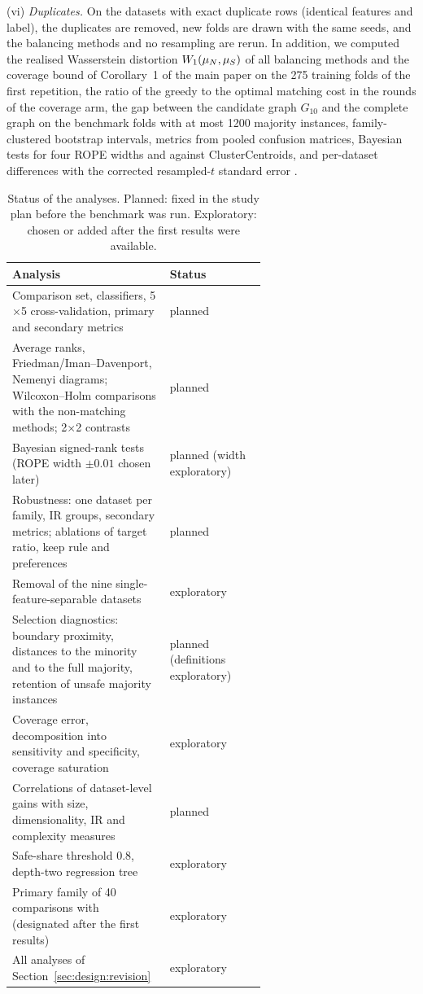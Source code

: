 (vi) \emph{Duplicates.} On the datasets with exact duplicate rows (identical features and label), the duplicates are removed, new folds are drawn with the same seeds, and the balancing methods and no resampling are rerun.
In addition, we computed the realised Wasserstein distortion $W_1(\mu_N,\mu_S)$ of all balancing methods and the coverage bound of Corollary~1 of the main paper on the 275 training folds of the first repetition, the ratio of the greedy to the optimal matching cost in the rounds of the coverage arm, the gap between the candidate graph $G_{10}$ and the complete graph on the benchmark folds with at most 1200 majority instances, family-clustered bootstrap intervals, metrics from pooled confusion matrices, Bayesian tests for four ROPE widths and against ClusterCentroids, and per-dataset differences with the corrected resampled-$t$ standard error \citep{nadeau2003inference}.

\begin{table}[t]
\centering
\caption{Status of the analyses. Planned: fixed in the study plan before the benchmark was run. Exploratory: chosen or added after the first results were available.}\label{tab:analysis_status}
\footnotesize
\begin{tabular}{@{}p{0.62\linewidth}l@{}}
\toprule
Analysis & Status \\
\midrule
Comparison set, classifiers, 5$\times$5 cross-validation, primary and secondary metrics & planned \\
Average ranks, Friedman/Iman--Davenport, Nemenyi diagrams; Wilcoxon--Holm comparisons with the non-matching methods; 2$\times$2 contrasts & planned \\
Bayesian signed-rank tests (ROPE width $\pm0.01$ chosen later) & planned (width exploratory) \\
Robustness: one dataset per family, IR groups, secondary metrics; ablations of target ratio, keep rule and preferences & planned \\
Removal of the nine single-feature-separable datasets & exploratory \\
Selection diagnostics: boundary proximity, distances to the minority and to the full majority, retention of unsafe majority instances & planned (definitions exploratory) \\
Coverage error, decomposition into sensitivity and specificity, coverage saturation & exploratory \\
Correlations of dataset-level gains with size, dimensionality, IR and complexity measures & planned \\
Safe-share threshold 0.8, depth-two regression tree & exploratory \\
Primary family of 40 comparisons with \RUS{} (designated after the first results) & exploratory \\
All analyses of Section~\ref{sec:design:revision} & exploratory \\
\bottomrule
\end{tabular}
\end{table}

